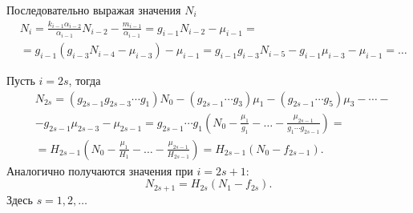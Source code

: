         Последовательно выражая значения \(N_{i}\) 
        \begin{equation*}
            \begin{split}
                & N_{i} = \frac{k_{i-1} \alpha_{i-2}}{\alpha_{i-1}} N_{i-2} - \frac{m_{i-1}}{\alpha_{i-1}} = g_{i-1} N_{i-2} - \mu_{i-1} =\\ 
                &= g_{i-1} \left( g_{i-3} N_{i-4} - \mu_{i-3} \right) - \mu_{i-1} = g_{i-1} g_{i-3} N_{i-5} - g_{i-1} \mu_{i-3} - \mu_{i-1} = \dots
            \end{split}
        \end{equation*}

        Пусть \(i = 2s\), тогда
        \begin{equation} \label{cycle_2s}
            \begin{split}
            & N_{2s} = ( g_{2s-1} g_{2s-3} \cdots g_1 ) N_0 - ( g_{2s-1} \cdots g_3 ) \mu_1 - ( g_{2s-1} \cdots g_5 ) \mu_3 - \cdots - \\
            & - g_{2s-1} \mu_{2s-3} - \mu_{2s-1} = g_{2s-1} \cdots g_1 \left( N_0 - \frac{\mu_1}{g_1} - \dots - \frac{\mu_{2s-1}}{g_1 \cdots g_{2s-1}} \right) = \\
            & = H_{2s-1} \left( N_0 - \frac{\mu_1}{H_1} - \dots - \frac{\mu_{2s-1}}{H_{2s-1}} \right)
            = H_{2s-1} \left( N_0 - f_{2s-1} \right).
            \end{split}
        \end{equation}
        Аналогично получаются значения при \(i = 2s + 1\): 
        \begin{equation} \label{cycle_2s1}
            N_{2s+1} = H_{2s} (N_1 - f_{2s}).
        \end{equation}
        Здесь \( s=1,2,\ldots \)

